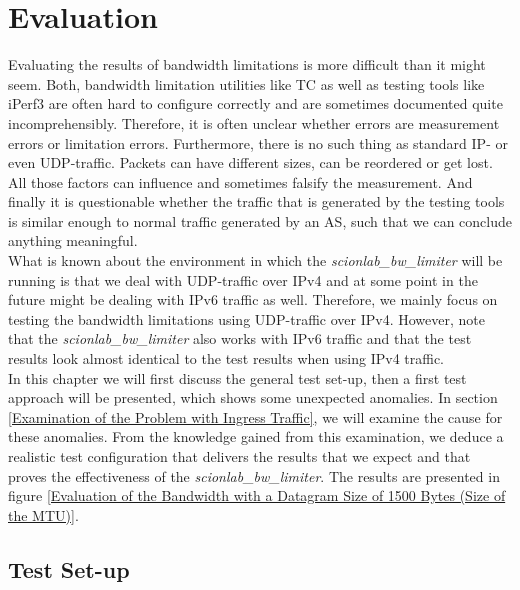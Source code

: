 \chapter{Evaluation}
Evaluating the results of bandwidth limitations is more difficult than it might seem. Both, bandwidth limitation utilities like \acs{TC} as well as testing tools like iPerf3 are often hard to configure correctly and are sometimes documented quite incomprehensibly. Therefore, it is often unclear whether errors are measurement errors or limitation errors. Furthermore, there is no such thing as standard \acs{IP}- or even \ac{UDP}-traffic. Packets can have different sizes, can be reordered or get lost. All those factors can influence and sometimes falsify the measurement. And finally it is questionable whether the traffic that is generated by the testing tools is similar enough to normal traffic generated by an \acs{AS}, such that we can conclude anything meaningful.
\\
What is known about the environment in which the \textit{scionlab\_bw\_limiter} will be running is that we deal with \acs{UDP}-traffic over \acs{IP}v4 and at some point in the future might be dealing with \acs{IP}v6 traffic as well. Therefore, we mainly focus on testing the bandwidth limitations using \acs{UDP}-traffic over \acs{IP}v4. However, note that the \textit{scionlab\_bw\_limiter} also works with \acs{IP}v6 traffic and that the test results look almost identical to the test results when using \acs{IP}v4 traffic.
\\
In this chapter we will first discuss the general test set-up, then a first test approach will be presented, which shows some unexpected anomalies. In section \ref{Examination of the Problem with Ingress Traffic}, we will examine the cause for these anomalies. From the  knowledge gained from this examination, we deduce a realistic test configuration that delivers the results that we expect and that proves the effectiveness of the \textit{scionlab\_bw\_limiter}. The results are presented in figure \ref{Evaluation of the Bandwidth with a Datagram Size of 1500 Bytes (Size of the MTU)}.

\newpage

\section{Test Set-up}

